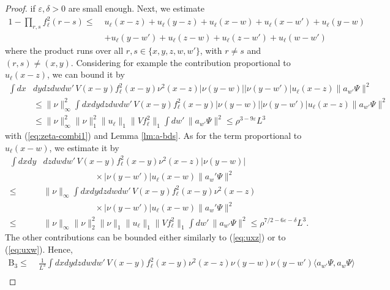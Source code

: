 \documentclass[10pt,a4paper]{amsart}
\def\eps{\varepsilon}
\begin{document}
\begin{proof}
if $\eps, \delta > 0$ are small enough. Next, we estimate 
\[ \begin{split}  1  - \prod_{r,s} f_\ell^2 (r-s) \leq \; &u_\ell (x-z) + u_\ell (y-z) + u_\ell (x-w) + u_\ell (x-w') +u_\ell (y-w) \\ &+ u_\ell (y-w') + u_\ell (z-w) + u_\ell (z-w') + u_\ell (w-w') \end{split} \]
where the product runs over all $r, s \in \{ x,y,z,w,w'\}$, with $r \not = s$ and $(r,s) \not = (x,y)$. Considering for example the contribution proportional to $u_\ell (x-z)$, we can bound it by 
\begin{equation} \label{eq:uxz} \begin{split}  \int dx &dy dz dw dw' \, V(x-y)f_\ell^2(x-y) \nu^2 (x-z) |\nu (y-w)| |\nu (y-w')| u_\ell (x-z) \| a_{w'} \Psi \|^2 \\  &\leq \| \nu \|_\infty^2 \int dx dy dz dw dw' \, V(x-y) f_\ell^2(x-y)|\nu (y-w)| |\nu (y-w')| u_\ell (x-z) \| a_{w'} \Psi \|^2 \\  &\leq \| \nu \|_\infty^2 \| \nu \|_1^2 \| u_\ell \|_1\|Vf_\ell^2\|_1 \int dw' \, \| a_{w'} \Psi \|^2 \leq  \rho^{3-9\eps}  L^3 \end{split} \end{equation}
with (\ref{eq:zeta-combi1}) and Lemma \ref{lm:a-bds}. As for the term proportional to $u_\ell (x-w)$, we estimate it by 
\begin{equation}\label{eq:uxw} \begin{split}  \int dx dy &dz dw dw' \, V(x-y) f_\ell^2(x-y) \nu^2 (x-z) |\nu (y-w)|\\
&\qquad\qquad\qquad\times|\nu (y-w')| u_\ell (x-w) \| a_w' \Psi \|^2 \\ 
\leq\;& \| \nu \|_\infty   \int dx dy dz dw dw' \, V(x-y)f_\ell^2(x-y) \nu^2 (x-z)\\
&\qquad\qquad\qquad\times|\nu (y-w')| u_\ell (x-w) \| a_w' \Psi \|^2 \\ \leq\;& \| \nu \|_\infty \| \nu \|_2^2 \| \nu \|_1 \| u_\ell \|_1\|Vf_\ell^2\|_1 \int dw' \, \| a_{w'} \Psi \|^2 \leq  \rho^{7/2-6\eps-\delta}  L^3. \end{split} \end{equation}
The other contributions can be bounded either similarly to (\ref{eq:uxz}) or to (\ref{eq:uxw}). Hence, 
\[\begin{split}
    \text{B}_3 \leq \;&\frac{1}{L^3} \int dx dy dz dw dw' \, V(x-y) f_\ell^2 (x-y)  \nu^2 (x-z) \nu (y-w) \nu (y-w')  \langle a_{w'} \Psi,  a_w \Psi \rangle  
\\

\end{split}\]
\end{proof}
\end{document}
